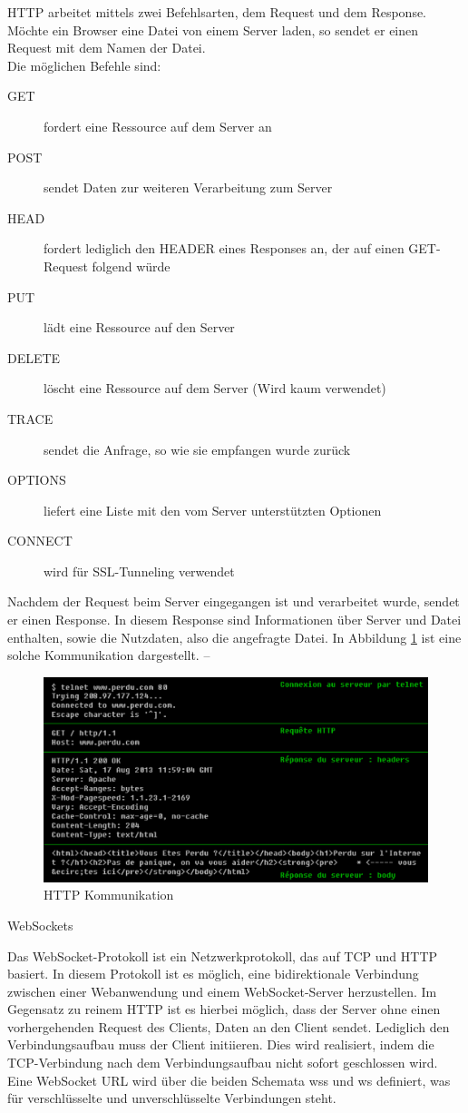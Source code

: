HTTP arbeitet mittels zwei Befehlsarten, dem Request und dem Response. Möchte ein Browser eine Datei von einem Server laden, so sendet er einen Request mit dem Namen der Datei. \\
Die möglichen Befehle sind: 
\begin{description}
	\item[GET] fordert eine Ressource auf dem Server an
	\item[POST] sendet Daten zur weiteren Verarbeitung zum Server
	\item[HEAD] fordert lediglich den HEADER eines Responses an, der auf einen GET-Request folgend würde
	\item[PUT] lädt eine Ressource auf den Server
	\item[DELETE] löscht eine Ressource auf dem Server (Wird kaum verwendet)
	\item[TRACE] sendet die Anfrage, so wie sie empfangen wurde zurück
	\item[OPTIONS] liefert eine Liste mit den vom Server unterstützten Optionen
	\item[CONNECT] wird für SSL-Tunneling verwendet
\end{description} Nachdem der Request beim Server eingegangen ist und verarbeitet wurde, sendet er einen Response. In diesem Response sind Informationen über Server und Datei enthalten, sowie die Nutzdaten, also die angefragte Datei. In Abbildung \ref{fig:http_request_response} ist eine solche Kommunikation dargestellt.
-- 
\begin{figure}
	\includegraphics[width=\textwidth]{images/HTTP_request_response.pdf}
	\caption{HTTP Kommunikation}
	\label{fig:http_request_response}
\end{figure}



WebSockets

Das WebSocket-Protokoll ist ein Netzwerkprotokoll, das auf TCP und HTTP basiert. In diesem Protokoll ist es möglich, eine bidirektionale Verbindung zwischen einer Webanwendung und einem WebSocket-Server herzustellen. Im Gegensatz zu reinem HTTP ist es hierbei möglich, dass der Server ohne einen vorhergehenden Request des Clients, Daten an den Client sendet. Lediglich den Verbindungsaufbau muss der Client initiieren. Dies wird realisiert, indem die TCP-Verbindung nach dem Verbindungsaufbau nicht sofort geschlossen wird. 
Eine WebSocket URL wird über die beiden Schemata wss und ws definiert, was für verschlüsselte und unverschlüsselte Verbindungen steht.

